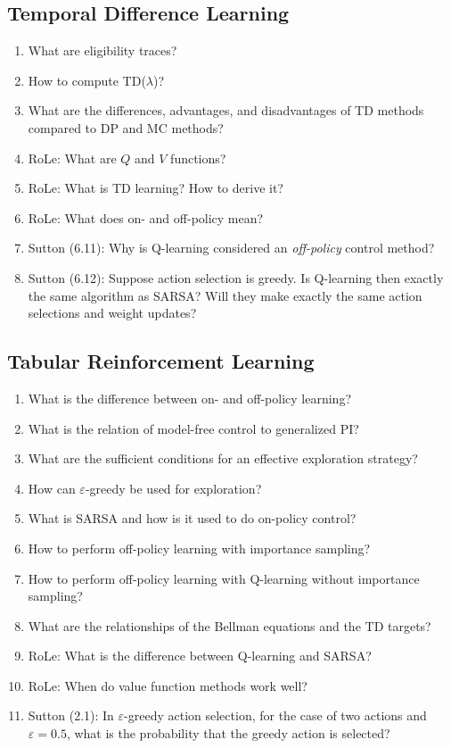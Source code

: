 		\subsection{Temporal Difference Learning}
			\begin{enumerate}
				\item What are eligibility traces?
				\item How to compute \acs{TD}(\(\lambda\))?
				\item What are the differences, advantages, and disadvantages of \ac{TD} methods compared to \ac{DP} and \ac{MC} methods?
				\item RoLe: What are \(Q\) and \(V\) functions?
				\item RoLe: What is \ac{TD} learning? How to derive it?
				\item RoLe: What does on- and off-policy mean?
				\item Sutton (6.11): Why is Q-learning considered an \emph{off-policy} control method?
				\item Sutton (6.12): Suppose action selection is greedy. Is Q-learning then exactly the same algorithm as \ac{SARSA}? Will they make exactly the same action selections and weight updates?
			\end{enumerate}

		\subsection{Tabular Reinforcement Learning}
			\begin{enumerate}
				\item What is the difference between on- and off-policy learning?
				\item What is the relation of model-free control to generalized \ac{PI}?
				\item What are the sufficient conditions for an effective exploration strategy?
				\item How can \(\varepsilon\)-greedy be used for exploration?
				\item What is \ac{SARSA} and how is it used to do on-policy control?
				\item How to perform off-policy learning with importance sampling?
				\item How to perform off-policy learning with Q-learning without importance sampling?
				\item What are the relationships of the Bellman equations and the \ac{TD} targets?
				\item RoLe: What is the difference between Q-learning and \ac{SARSA}?
				\item RoLe: When do value function methods work well?
				\item Sutton (2.1): In \(\varepsilon\)-greedy action selection, for the case of two actions and \(\varepsilon = 0.5\), what is the probability that the greedy action is selected?
			\end{enumerate}

